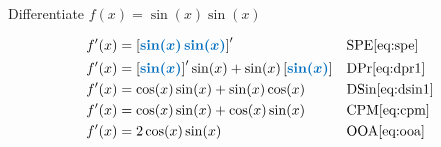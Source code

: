 \documentclass[20150903-160354-rs2.2-MarksMathNotebook.tex]{subfiles}
\begin{document}
\begin{example}[id:20141209-151354] \label{20141209-151354} \hfill \\

Differentiate $f(x)=\sin(x)\sin(x)$

\soln

\solnsteps
\begin{align*}
f'(x) &= \farg{\sin(x)\sin(x)}' && \text{SPE} \eqref{eq:spe} \\
f'(x) &= \farg{\sin(x)}' \sin(x) + \sin (x) \farg{\sin(x)} && \text{DPr} \eqref{eq:dpr1} \\
f'(x) &= \cos(x) \sin(x) + \sin (x) \cos(x) && \text{DSin} \eqref{eq:dsin1} \\
f'(x) &= \cos(x)\sin(x) + \cos(x)\sin(x) && \text{CPM} \eqref{eq:cpm} \\
f'(x) &= 2\cos(x)\sin(x) && \text{OOA} \eqref{eq:ooa} %
\end{align*}
\end{example}
\end{document}
